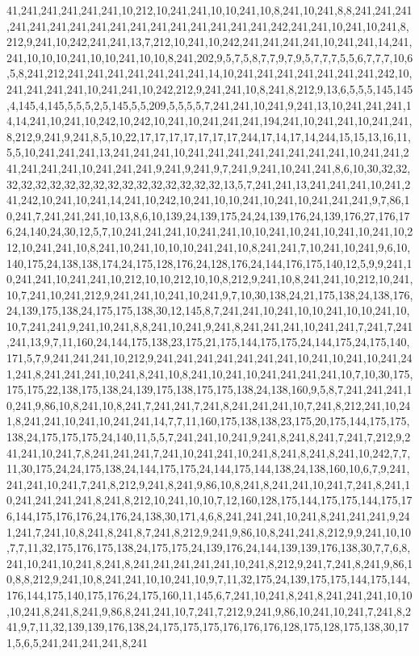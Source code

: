 41,241,241,241,241,241,10,212,10,241,241,10,10,241,10,8,241,10,241,8,8,241,241,241,241,241,241,241,241,241,241,241,241,241,241,241,241,242,241,241,10,241,10,241,8,212,9,241,10,242,241,241,13,7,212,10,241,10,242,241,241,241,241,10,241,241,14,241,241,10,10,10,241,10,10,241,10,10,8,241,202,9,5,7,5,8,7,7,9,7,9,5,7,7,7,5,5,6,7,7,7,10,6,5,8,241,212,241,241,241,241,241,241,241,14,10,241,241,241,241,241,241,241,242,10,241,241,241,241,10,241,241,10,242,212,9,241,241,10,8,241,8,212,9,13,6,5,5,5,145,145,4,145,4,145,5,5,5,2,5,145,5,5,209,5,5,5,5,7,241,241,10,241,9,241,13,10,241,241,241,14,14,241,10,241,10,242,10,242,10,241,10,241,241,241,194,241,10,241,241,10,241,241,8,212,9,241,9,241,8,5,10,22,17,17,17,17,17,17,17,244,17,14,17,14,244,15,15,13,16,11,5,5,10,241,241,241,13,241,241,241,10,241,241,241,241,241,241,241,241,10,241,241,241,241,241,241,10,241,241,241,9,241,9,241,9,7,241,9,241,10,241,241,8,6,10,30,32,32,32,32,32,32,32,32,32,32,32,32,32,32,32,32,32,13,5,7,241,241,13,241,241,241,10,241,241,242,10,241,10,241,14,241,10,242,10,241,10,10,241,10,241,10,241,241,241,9,7,86,10,241,7,241,241,241,10,13,8,6,10,139,24,139,175,24,24,139,176,24,139,176,27,176,176,24,140,24,30,12,5,7,10,241,241,241,10,241,241,10,10,241,10,241,10,241,10,241,10,212,10,241,241,10,8,241,10,241,10,10,10,241,241,10,8,241,241,7,10,241,10,241,9,6,10,140,175,24,138,138,174,24,175,128,176,24,128,176,24,144,176,175,140,12,5,9,9,241,10,241,241,10,241,241,10,212,10,10,212,10,10,8,212,9,241,10,8,241,241,10,212,10,241,10,7,241,10,241,212,9,241,241,10,241,10,241,9,7,10,30,138,24,21,175,138,24,138,176,24,139,175,138,24,175,175,138,30,12,145,8,7,241,241,10,241,10,10,241,10,10,241,10,10,7,241,241,9,241,10,241,8,8,241,10,241,9,241,8,241,241,241,10,241,241,7,241,7,241,241,13,9,7,11,160,24,144,175,138,23,175,21,175,144,175,175,24,144,175,24,175,140,171,5,7,9,241,241,241,10,212,9,241,241,241,241,241,241,241,10,241,10,241,10,241,241,241,8,241,241,241,10,241,8,241,10,8,241,10,241,10,241,241,241,241,10,7,10,30,175,175,175,22,138,175,138,24,139,175,138,175,175,138,24,138,160,9,5,8,7,241,241,241,10,241,9,86,10,8,241,10,8,241,7,241,241,7,241,8,241,241,241,10,7,241,8,212,241,10,241,8,241,241,10,241,10,241,241,14,7,7,11,160,175,138,138,23,175,20,175,144,175,175,138,24,175,175,175,24,140,11,5,5,7,241,241,10,241,9,241,8,241,8,241,7,241,7,212,9,241,241,10,241,7,8,241,241,241,7,241,10,241,241,10,241,8,241,8,241,8,241,10,242,7,7,11,30,175,24,24,175,138,24,144,175,175,24,144,175,144,138,24,138,160,10,6,7,9,241,241,241,10,241,7,241,8,212,9,241,8,241,9,86,10,8,241,8,241,241,10,241,7,241,8,241,10,241,241,241,241,8,241,8,212,10,241,10,10,7,12,160,128,175,144,175,175,144,175,176,144,175,176,176,24,176,24,138,30,171,4,6,8,241,241,241,10,241,8,241,241,241,9,241,241,7,241,10,8,241,8,241,8,7,241,8,212,9,241,9,86,10,8,241,241,8,212,9,9,241,10,10,7,7,11,32,175,176,175,138,24,175,175,24,139,176,24,144,139,139,176,138,30,7,7,6,8,241,10,241,10,241,8,241,8,241,241,241,241,241,10,241,8,212,9,241,7,241,8,241,9,86,10,8,8,212,9,241,10,8,241,241,10,10,241,10,9,7,11,32,175,24,139,175,175,144,175,144,176,144,175,140,175,176,24,175,160,11,145,6,7,241,10,241,8,241,8,241,241,241,10,10,10,241,8,241,8,241,9,86,8,241,241,10,7,241,7,212,9,241,9,86,10,241,10,241,7,241,8,241,9,7,11,32,139,139,176,138,24,175,175,175,176,176,176,128,175,128,175,138,30,171,5,6,5,241,241,241,241,8,241